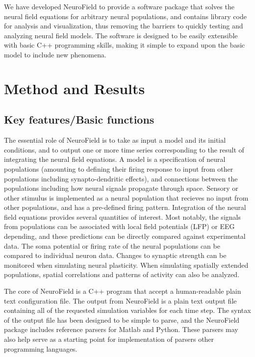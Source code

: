 \documentclass[preprint,review,10pt,authoryear,letterpaper]{elsarticle}
\begin{document}
We have developed NeuroField to provide a software package that solves the neural field equations for arbitrary neural populations, and contains library code for analysis and visualization, thus removing the barriers to quickly testing and analyzing neural field models. The software is designed to be easily extensible with basic C++ programming skills, making it simple to expand upon the basic model to include new phenomena. 

\section{Method and Results}
\label{sec:theory}

\subsection{Key features/Basic functions}
The essential role of NeuroField is to take as input a model and its initial conditions, and to output one or more time series corresponding to the result of integrating the neural field equations. A model is a specification of neural populations (amounting to defining their firing response to input from other populations including synapto-dendritic effects), and connections between the populations including how neural signals propagate through space. Sensory or other stimulus is implemented as a neural population that recieves no input from other populations, and has a pre-defined firing pattern. Integration of the neural field equations provides several quantities of interest. Most notably, the signals from populations can be associated with local field potentials (LFP) or EEG depending, and these predictions can be directly compared against experimental data. The soma potential or firing rate of the neural populations can be compared to individual neuron data. Changes to synaptic strength can be monitored when simulating neural plasticity. When simulating spatially extended populations, spatial correlations and patterns of activity can also be analyzed. 


The core of NeuroField is a C++ program that accept a human-readable plain text configuration file. The output from NeuroField is a plain text output file containing all of the requested simulation variables for each time step. The syntax of the output file has been designed to be simple to parse, and the NeuroField package includes reference parsers for Matlab and Python. These parsers may also help serve as a starting point for implementation of parsers other programming languages. 
\end{document}
